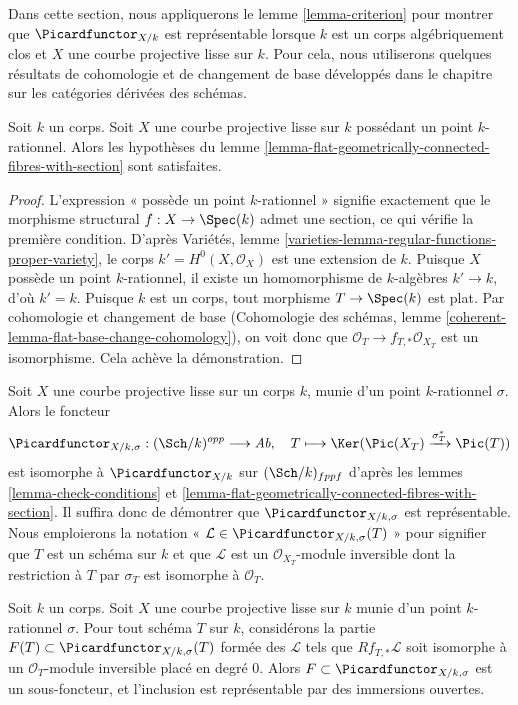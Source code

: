 \noindent
Dans cette section, nous appliquerons le lemme \ref{lemma-criterion} pour montrer que
$\Picardfunctor_{X/k}$ est représentable lorsque $k$ est un corps algébriquement
clos et $X$ une courbe projective lisse sur $k$. Pour cela,
nous utiliserons quelques résultats de cohomologie et de changement de base développés dans
le chapitre sur les catégories dérivées des schémas.

\begin{lemma}
\label{lemma-check-conditions}
Soit $k$ un corps. Soit $X$ une courbe projective lisse sur $k$
possédant un point $k$-rationnel. Alors les hypothèses du
lemme \ref{lemma-flat-geometrically-connected-fibres-with-section}
sont satisfaites.
\end{lemma}

\begin{proof}
L'expression « possède un point $k$-rationnel » signifie exactement que
le morphisme structural $f : X \to \Spec(k)$ admet une section, ce qui
vérifie la première condition.
D'après Variétés, lemme \ref{varieties-lemma-regular-functions-proper-variety},
le corps $k' = H^0(X, \mathcal{O}_X)$ est une extension de $k$.
Puisque $X$ possède un point $k$-rationnel, il existe un homomorphisme de $k$-algèbres
$k' \to k$, d'où $k' = k$.
Puisque $k$ est un corps, tout morphisme $T \to \Spec(k)$ est plat.
Par cohomologie et changement de base
(Cohomologie des schémas, lemme \ref{coherent-lemma-flat-base-change-cohomology}),
on voit donc que $\mathcal{O}_T \to f_{T, *}\mathcal{O}_{X_T}$ est un isomorphisme.
Cela achève la démonstration.
\end{proof}

\noindent
Soit $X$ une courbe projective lisse sur un corps $k$, munie d'un
point $k$-rationnel $\sigma$. Alors le foncteur
$$
\Picardfunctor_{X/k, \sigma} : (\Sch/k)^{opp} \longrightarrow \textit{Ab},\quad
T \longmapsto \Ker(\Pic(X_T) \xrightarrow{\sigma_T^*} \Pic(T))
$$
est isomorphe à $\Picardfunctor_{X/k}$ sur $(\Sch/k)_{fppf}$
d'après les lemmes \ref{lemma-check-conditions} et
\ref{lemma-flat-geometrically-connected-fibres-with-section}.
Il suffira donc de démontrer que $\Picardfunctor_{X/k, \sigma}$
est représentable. Nous emploierons la notation
« $\mathcal{L} \in \Picardfunctor_{X/k, \sigma}(T)$ » pour signifier que
$T$ est un schéma sur $k$ et que $\mathcal{L}$ est un
$\mathcal{O}_{X_T}$-module inversible dont la restriction à $T$ par $\sigma_T$
est isomorphe à $\mathcal{O}_T$.

\begin{lemma}
\label{lemma-define-open}
Soit $k$ un corps. Soit $X$ une courbe projective lisse sur $k$
munie d'un point $k$-rationnel $\sigma$. Pour tout schéma $T$ sur $k$,
considérons la partie $F(T) \subset \Picardfunctor_{X/k, \sigma}(T)$ formée des
$\mathcal{L}$ tels que $Rf_{T, *}\mathcal{L}$ soit isomorphe à un
$\mathcal{O}_T$-module inversible placé en degré $0$. Alors
$F \subset \Picardfunctor_{X/k, \sigma}$ est un sous-foncteur, et l'inclusion est
représentable par des immersions ouvertes.
\end{lemma}

